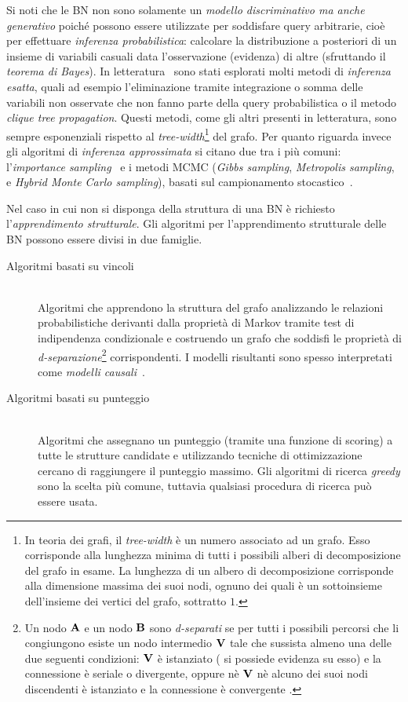Si noti che le \acl{BN} non sono solamente un \emph{modello discriminativo ma anche generativo} poiché possono essere utilizzate per soddisfare query arbitrarie, cioè per effettuare \emph{inferenza probabilistica}: calcolare la distribuzione a posteriori di un insieme di variabili casuali data l'osservazione (evidenza) di altre (sfruttando il \emph{teorema di Bayes}). In letteratura~\citep[si veda][]{Heckerman1996} sono stati esplorati molti metodi di \emph{inferenza esatta}, quali ad esempio l'eliminazione tramite integrazione o somma delle variabili non osservate che non fanno parte della query probabilistica o il metodo \emph{clique tree propagation}. Questi metodi, come gli altri presenti in letteratura, sono sempre esponenziali rispetto al \emph{tree-width}\footnote{In teoria dei grafi, il \emph{tree-width} è un numero associato ad un grafo. Esso corrisponde alla lunghezza minima di tutti i possibili alberi di decomposizione del grafo in esame. La lunghezza di un albero di decomposizione corrisponde alla dimensione massima dei suoi nodi, ognuno dei quali è un sottoinsieme dell'insieme dei vertici del grafo, sottratto $1$.} del grafo. Per quanto riguarda invece gli algoritmi di \emph{inferenza approssimata} si citano due tra i più comuni: l'\emph{importance sampling}~\citep{Shachter1990} e i metodi \acf{MCMC} (\emph{Gibbs sampling}, \emph{Metropolis sampling}, e \emph{Hybrid Monte Carlo sampling}), basati sul campionamento stocastico~\citep[si veda][]{Geman1984,Gilks1996,MacKay1998}.

Nel caso in cui non si disponga della struttura di una \acs{BN} è richiesto l'\emph{apprendimento strutturale}. Gli algoritmi per l'apprendimento strutturale delle \acl{BN} possono essere divisi in due famiglie.
\begin{description}
    \item[Algoritmi basati su vincoli] \hfill \\
    Algoritmi che apprendono la struttura del grafo analizzando le relazioni probabilistiche derivanti dalla proprietà di Markov tramite test di indipendenza condizionale e costruendo un grafo che soddisfi le proprietà di \emph{d-separazione}\footnote{Un nodo $\mathbf{A}$ e un nodo $\mathbf{B}$ sono \emph{d-separati} se per tutti i possibili percorsi che li congiungono esiste un nodo intermedio $\mathbf{V}$ tale che sussista almeno una delle due seguenti condizioni: $\mathbf{V}$ è istanziato (\ie{} si possiede evidenza su esso) e la connessione è seriale o divergente, oppure nè $\mathbf{V}$ nè alcuno dei suoi nodi discendenti è istanziato e la connessione è convergente \citep{Jensen2007}.} corrispondenti. I modelli risultanti sono spesso interpretati come \emph{modelli causali}~\citep{Pearl1988}.
    \item[Algoritmi basati su punteggio] \hfill \\
    Algoritmi che assegnano un punteggio (tramite una funzione di scoring) a tutte le strutture candidate e utilizzando tecniche di ottimizzazione cercano di raggiungere il punteggio massimo. Gli algoritmi di ricerca \emph{greedy} sono la scelta più comune, tuttavia qualsiasi procedura di ricerca può essere usata.
\end{description}

